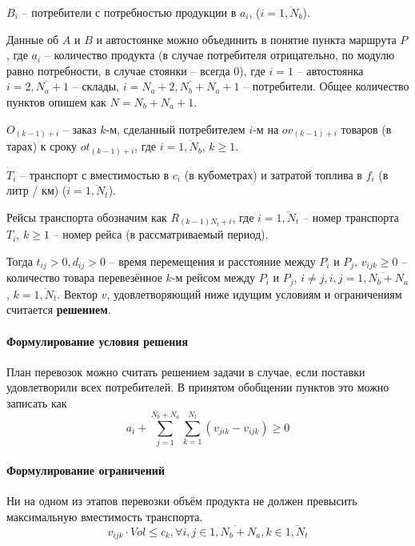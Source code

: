 	$B_i$ -- потребители с потребностью продукции в $a_i$, ($i = \overline{1, N_b}$).
	
	Данные об $A$ и $B$ и автостоянке можно объединить в понятие пункта маршрута $P$, где $a_i$ -- количество продукта (в случае потребителя отрицательно, по модулю равно потребности, в случае стоянки -- всегда 0), где $i = 1$ -- автостоянка $i = \overline{2, N_a + 1}$ -- склады, $i = \overline{N_a+2, N_b+N_a+1}$ -- потребители. Общее количество пунктов опишем как $N = N_b+N_a+1$.
	
	$O_{(k-1) + i}$ -- заказ $k$-м, сделанный потребителем $i$-м на $ov_{(k-1) + i}$ товаров (в тарах) к сроку $ot_{(k-1) + i}$, где $i = \overline{1, N_b}$, $k \ge 1$.
		
	$T_i$ -- транспорт с вместимостью в $c_i$ (в кубометрах) и затратой топлива в $f_i$ (в литр / км) ($i = \overline{1, N_t}$). 
	
	Рейсы транспорта обозначим как $R_{(k-1)N_t + i}$, где $i = \overline{1, N_t}$ -- номер транспорта $T_i$, $k \ge 1$ -- номер рейса (в рассматриваемый период).
	
	Тогда $t_{ij} > 0, d_{ij} > 0$ -- время перемещения и расстояние между $P_i$ и $P_j$, $v_{ijk} \ge 0$ -- количество товара перевезённое $k$-м рейсом между $P_i$ и $P_j$, $i \ne j, i, j = \overline{1, N_b+N_a}$, $k = \overline{1, N_t}$. Вектор $v$, удовлетворяющий ниже идущим условиям и ограничениям считается \textbf{решением}.
	
	\paragraph{Формулирование условия решения}    
	План перевозок можно считать решением задачи в случае, если поставки удовлетворили всех потребителей. В принятом обобщении пунктов это можно записать как
	\begin{equation}
		a_i + \sum_{j=1}^{N_b+N_a} \sum_{k=1}^{N_t} (v_{jik} - v_{ijk}) \ge 0
	\end{equation}
	
	\paragraph{Формулирование ограничений}     
	
	Ни на одном из этапов перевозки объём продукта не должен превысить максимальную вместимость транспорта.
	\begin{equation}
		v_{ijk} \cdot Vol \le c_k, \forall i, j \in \overline{1, N_b+N_a}, k \in \overline{1, N_t}
	\end{equation}

